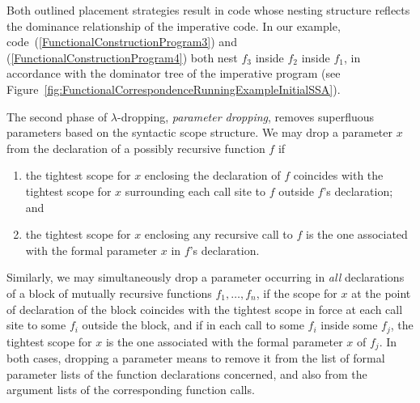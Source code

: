 Both outlined placement strategies result in code whose nesting
structure reflects the dominance relationship of the imperative code.
In our example, code~(\ref{FunctionalConstructionProgram3}) and
(\ref{FunctionalConstructionProgram4}) both nest $f_3$ inside $f_2$
inside $f_1$, in accordance with the dominator tree of the imperative
program (see
Figure~\ref{fig:FunctionalCorrespondenceRunningExampleInitialSSA}).

The second phase of $\lambda$-dropping, \emph{parameter dropping},
removes superfluous parameters based on the syntactic scope structure.
We may drop a parameter $x$ from the declaration of a possibly
recursive function $f$ if
\begin{enumerate}
\item\label{ParameterDroppingConditionOne} the tightest scope for $x$
  enclosing the declaration of $f$ coincides with the tightest scope
  for $x$ surrounding each call site to $f$ outside $f$'s declaration;
  and
\item\label{ParameterDroppingConditionTwo} the tightest scope for $x$
  enclosing any recursive call to $f$ is the one associated with the formal
  parameter $x$ in $f$'s declaration.
\end{enumerate}
Similarly, we may simultaneously drop a parameter occurring in
\emph{all} declarations of a block of mutually recursive functions
$f_1,\ldots,f_n$, if the scope for $x$ at the point of declaration of
the block coincides with the tightest scope in force at each call site
to some $f_i$ outside the block, and if in each call to some $f_i$
inside some $f_j$, the tightest scope for $x$ is the one associated
with the formal parameter $x$ of $f_j$. In both cases, dropping a
parameter means to remove it from the list of formal parameter lists
of the function declarations concerned, and also from the argument
lists of the corresponding function calls.

